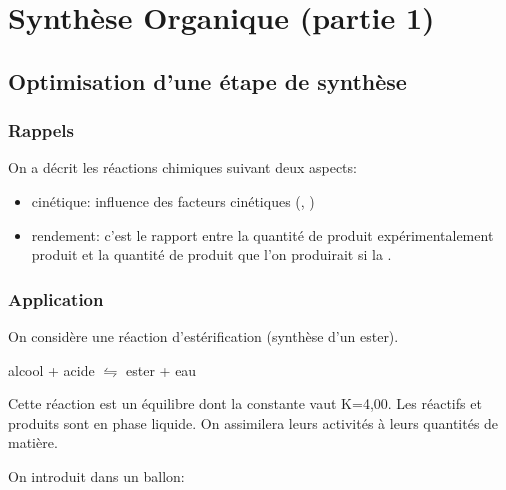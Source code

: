 \setcounter{chapter}{19}
\chapter{Synthèse Organique (partie 1)}
\section{Optimisation d'une étape de synthèse}
\subsection{Rappels}

On a décrit les réactions chimiques suivant deux aspects:
\begin{itemize}
	\item cinétique: influence des facteurs cinétiques (, )
	\item rendement: c'est le rapport entre la quantité de produit expérimentalement produit et la quantité de produit que l'on produirait si la .\
\end{itemize}
\subsection{Application}

On considère une réaction d'estérification (synthèse d'un ester). 
\begin{center}
	alcool + acide $\leftrightharpoons$ ester + eau
\end{center}

Cette réaction est un équilibre dont la constante vaut K=4,00. Les réactifs et produits sont en phase liquide. On assimilera leurs activités à leurs quantités de matière.

On introduit dans un ballon:


